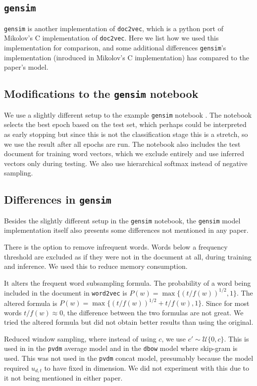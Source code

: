 \documentclass{article}
\begin{document}
\begin{appendices}
\section{\texttt{gensim}} \label{sec:gensim}
\texttt{gensim} is another implementation of \texttt{doc2vec}, which is a python port of Mikolov's C implementation of \texttt{doc2vec}. Here we list how we used this implementation for comparison, and some additional differences \texttt{gensim}'s implementation (inroduced in Mikolov's C implementation) has compared to the paper's model.

\subsection{Modifications to the \texttt{gensim} notebook}
We use a slightly different setup to the example \texttt{gensim} notebook \citep{mohr_gensim_2017}. The notebook selects the best epoch based on the test set, which perhaps could be interpreted as early stopping but since this is not the classification stage this is a stretch, so we use the result after all epochs are run. The notebook also includes the test document for training word vectors, which we exclude entirely and use inferred vectors only during testing. We also use hierarchical softmax instead of negative sampling.

\subsection{Differences in \texttt{gensim}}
Besides the slightly different setup in the \texttt{gensim} notebook, the \texttt{gensim} model implementation itself also presents some differences not mentioned in any paper.

There is the option to remove infrequent words. Words below a frequency threshold are excluded as if they were not in the document at all, during training and inference. We used this to reduce memory consumption.

It alters the frequent word subsampling formula. The probability of a word being included in the document in \texttt{word2vec} is $P(w)=\max\{(t/f(w))^{1/2}, 1\}$. The altered formula is $P(w)=\max\{(t/f(w))^{1/2} + {t/f(w)}, 1\}$. Since for most words $t/f(w)\approx 0$, the difference between the two formulas are not great. We tried the altered formula but did not obtain better results than using the original.

Reduced window sampling, where instead of using $c$, we use $c'\sim\mathcal{U}\{0,c\}$. This is used in in the \texttt{pvdm} average model and in the \texttt{dbow} model where skip-gram is used. This was not used in the \texttt{pvdm} concat model, presumably because the model required $u_{d,t}$ to have fixed in dimension. We did not experiment with this due to it not being mentioned in either paper.


\end{appendices}
\end{document}
